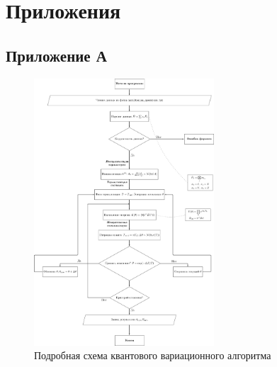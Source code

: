 \documentclass[a4paper]{report}
\begin{document}

\chapter*{Приложения}
\section*{Приложение А}
\begin{figure}[ht]
\centering
\includegraphics[width=0.6\textwidth]{figures/scheme.pdf}
\caption{Подробная схема квантового вариационного алгоритма}
\label{DetailedQuantumVariationAlgorithmScheme}
\end{figure}
\end{document}
